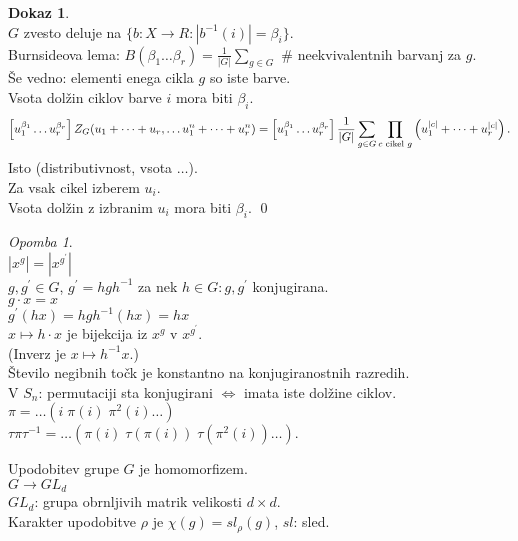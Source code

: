 \documentclass[a4paper, 12pt]{book}
\theoremstyle{definition}
\newtheorem{pro}[counter]{Dokaz}
\theoremstyle{remark}
\newtheorem*{rem}{Opomba}
\begin{document}
\begin{pro} \text{} \\
  $G$ zvesto deluje na $\{b: X \to R: \left|b^{-1}(i)\right| = \beta_i\}$. \\
  Burnsideova lema: $B(\beta_1 \dots \beta_r) = \frac{1}{|G|} \sum_{g \in G}$ \# neekvivalentnih barvanj za $g$. \\
  Še vedno: elementi enega cikla $g$ so iste barve. \\
  Vsota dolžin ciklov barve $i$ mora biti $\beta_i$.
  \begin{equation*}
    \left[u_1^{\beta_1} \dots u_r^{\beta_r}\right] Z_G(u_1 + \dots + u_r, \dots u_1^n + \dots + u_r^n) \\
    = \left[u_1^{\beta_1} \dots u_r^{\beta_r}\right] \frac{1}{|G|} \sum_{g \in G} \prod_{c \text{ cikel } g}
      \left(u_1^{|c|} + \dots + u_r^{|c|}\right).
  \end{equation*}
  Isto (distributivnost, vsota $\dots$). \\
  Za vsak cikel izberem $u_i$. \\
  Vsota dolžin z izbranim $u_i$ mora biti $\beta_i$.
  \qed
\end{pro}
\begin{rem} \text{} \\
  $\left|x^g\right| = \left|x^{g^{'}}\right|$ \\
  $g, g^{'} \in G$, $g^{'} = h g h^{-1}$ za nek $h \in G: g, g^{'}$ konjugirana. \\
  $g \cdot x = x$ \\
  $g^{'} (h x) = h g h^{-1} (h x) = h x$ \\
  $x \mapsto h \cdot x$ je bijekcija iz $x^g$ v $x^{g^{'}}$. \\
  (Inverz je $x \mapsto h^{-1} x$.) \\
  Število negibnih točk je konstantno na konjugiranostnih razredih. \\
  V $S_n$: permutaciji sta konjugirani $\iff$ imata iste dolžine ciklov. \\
  $\pi = \dots (i \; \pi(i) \; \pi^2(i) \dots)$ \\
  $\tau \pi \tau^{-1} = \dots (\pi(i) \; \tau(\pi(i)) \; \tau\left(\pi^2(i)\right) \dots)$.
\end{rem}
Upodobitev grupe $G$ je homomorfizem. \\
$G \to GL_d$ \\
$GL_d$: grupa obrnljivih matrik velikosti $d \times d$. \\
Karakter upodobitve $\rho$ je $\chi(g) = sl_{\rho}(g)$, $sl$: sled. \\
\end{document}
